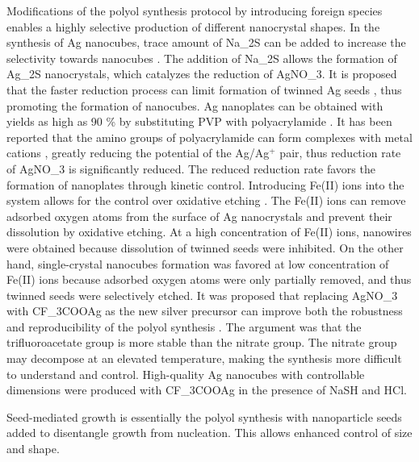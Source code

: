 Modifications of the polyol synthesis protocol by introducing foreign species enables a highly selective production of different nanocrystal shapes.
In the synthesis of Ag nanocubes, trace amount of Na_2S can be added to increase the selectivity towards nanocubes \cite{Skrabalak_2007,Siekkinen_2006}.
The addition of Na_2S allows the formation of Ag_2S nanocrystals, which catalyzes the reduction of AgNO_3.
It is proposed that the faster reduction process can limit formation of twinned Ag seeds \cite{Wiley_2006}, thus promoting the formation of nanocubes.
Ag nanoplates can be obtained with yields as high as 90 \% by substituting PVP with polyacrylamide \cite{Xiong_2007}.
It has been reported that the amino groups of polyacrylamide can form complexes with metal cations \cite{Sari_2006}, greatly reducing the potential of the Ag/Ag$^+$ pair, thus reduction rate of AgNO_3 is significantly reduced.
The reduced reduction rate favors the formation of nanoplates through kinetic control.
Introducing Fe(II) ions into the system allows for the control over oxidative etching \cite{Wiley_2005}.
The Fe(II) ions can remove adsorbed oxygen atoms from the surface of Ag nanocrystals and prevent their dissolution by oxidative etching.
At a high concentration of Fe(II) ions, nanowires were obtained because dissolution of twinned seeds were inhibited.
On the other hand, single-crystal nanocubes formation was favored at low concentration of Fe(II) ions because adsorbed oxygen atoms were only partially removed, and thus twinned seeds were selectively etched.
It was proposed that replacing AgNO_3 with CF_3COOAg as the new silver precursor can improve both the robustness and reproducibility of the polyol synthesis \cite{Zhang_2010}.
The argument was that the trifluoroacetate group is more stable than the nitrate group.
The nitrate group may decompose at an elevated temperature, making the synthesis more difficult to understand and control.
High-quality Ag nanocubes with controllable dimensions were produced with CF_3COOAg in the presence of NaSH and HCl.

Seed-mediated growth is essentially the polyol synthesis with nanoparticle seeds added to disentangle growth from nucleation.
This allows enhanced control of size and shape.
  
  
  
  
  
  
  
  
  
  
  
  
  
  
  
  